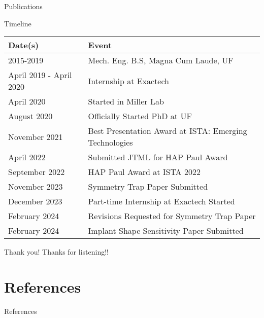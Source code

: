 \documentclass[presentation, aspectratio=1610]{beamer}
\begin{document}
\begin{frame}[label={sec:org378ad6d},fragile, allowframebreaks, label=]{Publications}
\begin{refsection}
  
  \printbibliography[title=Publications]
\end{refsection}
\end{frame}
\begin{frame}[label={sec:org71b8d48}]{Timeline}
\begin{center}
\begin{tabular}{ll}
Date(s) & Event\\
\hline
2015-2019 & Mech. Eng. B.S, Magna Cum Laude, UF\\
April 2019 - April 2020 & Internship at Exactech\\
April 2020 & Started in Miller Lab\\
August 2020 & Officially Started PhD at UF\\
November 2021 & Best Presentation Award at ISTA: Emerging Technologies\\
April 2022 & Submitted JTML for HAP Paul Award\\
September 2022 & HAP Paul Award at ISTA 2022\\
November 2023 & Symmetry Trap Paper Submitted\\
December 2023 & Part-time Internship at Exactech Started\\
February 2024 & Revisions Requested for Symmetry Trap Paper\\
February 2024 & Implant Shape Sensitivity Paper Submitted\\
\end{tabular}
\end{center}
\end{frame}
\begin{frame}[label={sec:org2050872}]{Thank you!}
Thanks for listening!!
\end{frame}
\section{References}
\label{sec:org602c556}
\begin{frame}[label={sec:orgf71cd81},fragile, allowframebreaks, label=]{References}
\AtNextBibliography{\tiny}
\printbibliography
\end{frame}
\end{document}
